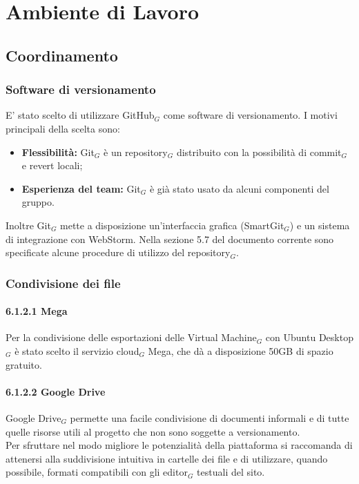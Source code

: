 \section{Ambiente di Lavoro} \label{ambientedilavoro}
\subsection{Coordinamento}
\subsubsection{Software di versionamento}
E' stato scelto di utilizzare GitHub$_G$ come software di versionamento. I motivi principali della scelta sono:
\begin{itemize}
	\item \textbf{Flessibilità:} Git$_G$ è un repository$_G$ distribuito con la possibilità di commit$_G$ e revert locali;
	\item \textbf{Esperienza del team:} Git$_G$ è già stato usato da alcuni componenti del gruppo.
\end{itemize}
Inoltre Git$_G$ mette a disposizione un'interfaccia grafica (SmartGit$_G$) e un sistema di integrazione con WebStorm.
Nella sezione 5.7 del documento corrente sono specificate alcune procedure di utilizzo del repository$_G$.

\subsubsection{Condivisione dei file}

\paragraph{6.1.2.1 Mega \\}
Per la condivisione delle esportazioni delle Virtual Machine$_G$ con Ubuntu Desktop$_G$ è stato scelto il servizio cloud$_G$ Mega, che dà a disposizione 50GB di spazio gratuito.

\paragraph{6.1.2.2 Google Drive\\}
Google Drive$_G$ permette una facile condivisione di documenti informali e di tutte quelle risorse utili al progetto che non sono soggette a versionamento. \\
Per sfruttare nel modo migliore le potenzialità della piattaforma si raccomanda di attenersi alla suddivisione intuitiva in cartelle dei file e di utilizzare, quando possibile, formati compatibili con gli editor$_G$ testuali del sito.

